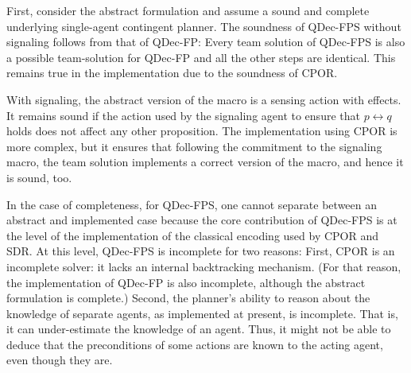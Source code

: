 \documentclass[letterpaper]{article}
\theoremstyle{definition}
\begin{document}
First, consider the abstract formulation and assume a sound and complete underlying single-agent contingent planner. The soundness of QDec-FPS without signaling follows from that of QDec-FP: Every team solution of QDec-FPS is also a possible team-solution for QDec-FP and all the other steps are identical. This remains true in the implementation due to the soundness of CPOR.

With signaling, the abstract version of the macro is a sensing action with effects.
It remains sound if the action used by the signaling agent to ensure that $p\leftrightarrow q$ holds does not affect any other proposition. The implementation using CPOR is more complex, but it ensures that following the commitment to the signaling macro, the team solution implements a correct version of the macro, and hence it is sound, too.

In the case of completeness, for QDec-FPS, one cannot
separate between an abstract and implemented case because the core contribution of QDec-FPS is at the level of
the implementation of the classical encoding used by CPOR and SDR. At this level, QDec-FPS is incomplete for two
reasons: First, CPOR is an incomplete solver: it lacks an internal backtracking mechanism. (For that reason, the implementation of QDec-FP is also incomplete, although the abstract formulation is complete.)
Second, the planner's ability to reason about the knowledge of separate agents, as implemented at present, is incomplete. That is, it can under-estimate the knowledge of an agent. Thus, it might not be able to deduce that the preconditions of some actions are known to the acting agent, even though they are.
\end{document}
